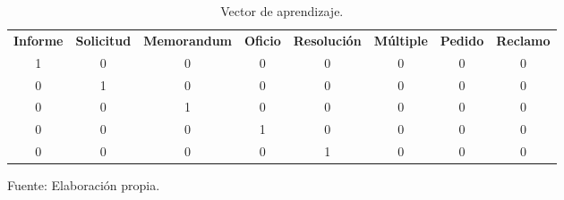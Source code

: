 \begin{table}[h!]
\centering
\caption{Vector de aprendizaje.}
\label{VectorApren}
\begin{tabular}{|c|c|c|c|c|c|c|c|}
\hline
\rowcolor[HTML]{68CBD0} 
\multicolumn{8}{|c|}{\cellcolor[HTML]{68CBD0}{\color[HTML]{FFFFFF} \textbf{Vectores de aprendizaje}}} \\ \hline
\rowcolor[HTML]{68CBD0} 
{\color[HTML]{FFFFFF} \textbf{Informe}} & {\color[HTML]{FFFFFF} \textbf{Solicitud}} & {\color[HTML]{FFFFFF} \textbf{Memorandum}} & {\color[HTML]{FFFFFF} \textbf{Oficio}} & {\color[HTML]{FFFFFF} \textbf{Resolución}} & {\color[HTML]{FFFFFF} \textbf{Múltiple}} & {\color[HTML]{FFFFFF} \textbf{Pedido}} & {\color[HTML]{FFFFFF} \textbf{Reclamo}} \\ \hline
1 & 0 & 0 & 0 & 0 & 0 & 0 & 0 \\ \hline
0 & 1 & 0 & 0 & 0 & 0 & 0 & 0 \\ \hline
0 & 0 & 1 & 0 & 0 & 0 & 0 & 0 \\ \hline
0 & 0 & 0 & 1 & 0 & 0 & 0 & 0 \\ \hline
0 & 0 & 0 & 0 & 1 & 0 & 0 & 0 \\ \hline
\end{tabular}
\begin{center}
    Fuente: Elaboración propia.
\end{center}
\end{table}

